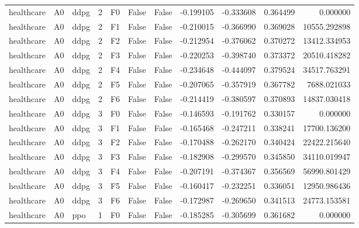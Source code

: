 \begin{tabular}{lllrlllrrrr}
healthcare &      A0 &      ddpg &     2 &  F0 &           False &            False & -0.199105 & -0.333608 & 0.364499 &         0.000000 \\
healthcare &      A0 &      ddpg &     2 &  F1 &           False &            False & -0.210015 & -0.366990 & 0.369028 &     10555.292898 \\
healthcare &      A0 &      ddpg &     2 &  F2 &           False &            False & -0.212954 & -0.376062 & 0.370272 &     13412.334953 \\
healthcare &      A0 &      ddpg &     2 &  F3 &           False &            False & -0.220253 & -0.398740 & 0.373372 &     20510.418282 \\
healthcare &      A0 &      ddpg &     2 &  F4 &           False &            False & -0.234648 & -0.444097 & 0.379524 &     34517.763291 \\
healthcare &      A0 &      ddpg &     2 &  F5 &           False &            False & -0.207065 & -0.357919 & 0.367782 &      7688.021033 \\
healthcare &      A0 &      ddpg &     2 &  F6 &           False &            False & -0.214419 & -0.380597 & 0.370893 &     14837.030418 \\
healthcare &      A0 &      ddpg &     3 &  F0 &           False &            False & -0.146593 & -0.191762 & 0.330157 &         0.000000 \\
healthcare &      A0 &      ddpg &     3 &  F1 &           False &            False & -0.165468 & -0.247211 & 0.338241 &     17700.136200 \\
healthcare &      A0 &      ddpg &     3 &  F2 &           False &            False & -0.170488 & -0.262170 & 0.340424 &     22422.215640 \\
healthcare &      A0 &      ddpg &     3 &  F3 &           False &            False & -0.182908 & -0.299570 & 0.345850 &     34110.019947 \\
healthcare &      A0 &      ddpg &     3 &  F4 &           False &            False & -0.207191 & -0.374367 & 0.356569 &     56990.801429 \\
healthcare &      A0 &      ddpg &     3 &  F5 &           False &            False & -0.160417 & -0.232251 & 0.336051 &     12950.986436 \\
healthcare &      A0 &      ddpg &     3 &  F6 &           False &            False & -0.172987 & -0.269650 & 0.341513 &     24773.153581 \\
healthcare &      A0 &       ppo &     1 &  F0 &           False &            False & -0.185285 & -0.305699 & 0.361682 &         0.000000 \\

\end{tabular}

